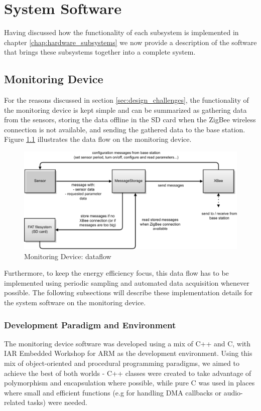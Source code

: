 \chapter{System Software}
\label{chap:system_software}
Having discussed how the functionality of each subsystem is implemented in chapter \ref{chap:hardware_subsystems} we now provide a description of the software that brings these subsystems together into a complete system. 


\section{Monitoring Device}
For the reasons discussed in section \ref{sec:design_challenges}, the functionality of the monitoring device is kept simple and can be summarized as gathering data from the sensors, storing the data offline in the SD card when the ZigBee wireless connection is not available, and sending the gathered data to the base station. Figure \ref{fig:dataflow_monitoring_device} illustrates the data flow on the monitoring device.

\begin{figure}
\includegraphics[width=\textwidth]{Images/monitoringdevice_dataflow}
\caption{Monitoring Device: dataflow}
\label{fig:dataflow_monitoring_device}
\end{figure}

Furthermore, to keep the energy efficiency focus, this data flow has to be implemented using periodic sampling and automated data acquisition whenever possible. The following subsections will describe these implementation details for the system software on the monitoring device.

\subsection{Development Paradigm and Environment}
The monitoring device software was developed using a mix of C++ and C, with IAR Embedded Workshop for ARM as the development environment. Using this mix of object-oriented and procedural programming paradigms, we aimed to achieve the best of both worlds - C++ classes were created to take advantage of polymorphism and encapsulation where possible, while pure C was used in places where small and efficient functions (e.g for handling DMA callbacks or audio-related tasks) were needed.

